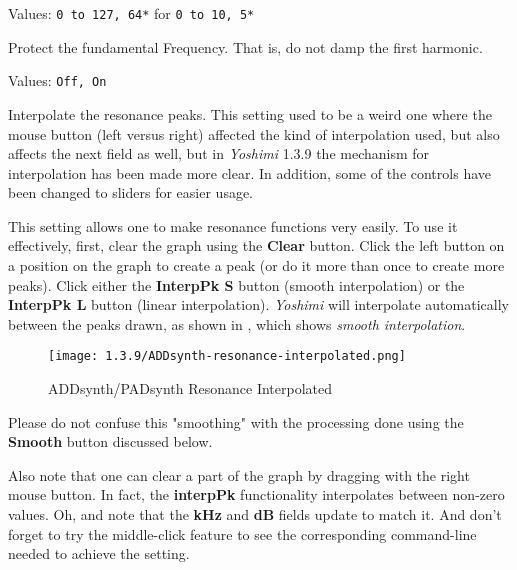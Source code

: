    Values: \texttt{0 to 127, 64*} for \texttt{0 to 10, 5*}

   Protect the fundamental Frequency.
   That is, do not damp the first harmonic.

   Values: \texttt{Off, On}

   Interpolate the resonance peaks.
   This setting used to be a weird one where the mouse button (left versus
   right) affected the kind of interpolation used,
   but also affects the next field as well, but in \textsl{Yoshimi} 1.3.9 the
   mechanism for interpolation has been made more clear.
   In addition, some of the controls have been changed to sliders for easier
   usage.

   This setting allows one to make resonance functions very easily.  To use
   it effectively, first, clear the graph using the \textbf{Clear} button.
   Click the left button on a position on the graph to create a peak (or do it
   more than once to create more peaks). Click either the
   \textbf{InterpPk S} button (smooth interpolation)
   or the \textbf{InterpPk L} button (linear interpolation).
   \textsl{Yoshimi} will interpolate automatically between the
   peaks drawn,
   as shown in ,
   which shows \textsl{smooth interpolation}.

\begin{figure}[H]
   \centering 
   \texttt{[image: 1.3.9/ADDsynth-resonance-interpolated.png]}
   \caption{ADDsynth/PADsynth Resonance Interpolated}
   \label{fig:addsynth_resonance_interpolated}
\end{figure}
   

   Please do not confuse this "smoothing" with the processing done using the
   \textbf{Smooth} button discussed below.
   
   Also note that one can clear a part of the graph
   by dragging with the right mouse button. In fact, the \textbf{interpPk}
   functionality interpolates between non-zero values.
   Oh, and note that the \textbf{kHz} and \textbf{dB} fields update to match it.
   And don't forget to try the middle-click feature to see the corresponding
   command-line needed to achieve the setting.

